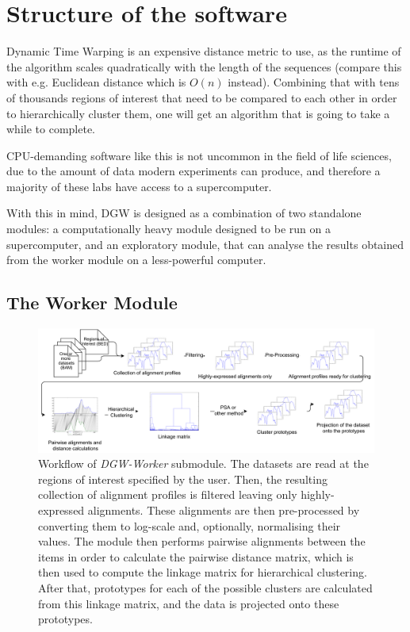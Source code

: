 \documentclass[parskip]{cs4rep}
\begin{document}
\section{Structure of the software}
Dynamic Time Warping is an expensive distance metric to use, as the runtime of the algorithm scales quadratically with the length of the sequences (compare this with e.g. Euclidean distance which is $O(n)$ instead). Combining that with tens of thousands regions of interest that need to be compared to each other in order to hierarchically cluster them, one will get an algorithm that is going to take a while to complete.

CPU-demanding software like this is not uncommon in the field of life sciences, due to the amount of data modern experiments can produce, and therefore a majority of these labs have access to a supercomputer.

With this in mind, DGW is designed as a combination of two standalone modules: a computationally heavy module designed to be run on a supercomputer, and an exploratory module, that can analyse the results obtained from the worker module on a less-powerful computer.

\subsection{The Worker Module}
\begin{figure}
    \centering
    \includegraphics[width=1.1\textwidth]{figures/implementation/DGW-worker-workflow.pdf}
    \caption{Workflow of \emph{DGW-Worker} submodule. The datasets are read at the regions of interest specified by the user. Then, the resulting collection of alignment profiles is filtered leaving only highly-expressed alignments. These alignments are then pre-processed by converting them to log-scale and, optionally, normalising their values. The module then performs pairwise alignments between the items in order to calculate the pairwise distance matrix, which is then used to compute the linkage matrix for hierarchical clustering. After that, prototypes for each of the possible clusters are calculated from this linkage matrix, and the data is projected onto these prototypes.}
    \label{fig:implementation:dgw-worker-workflow}
\end{figure}
\end{document}
